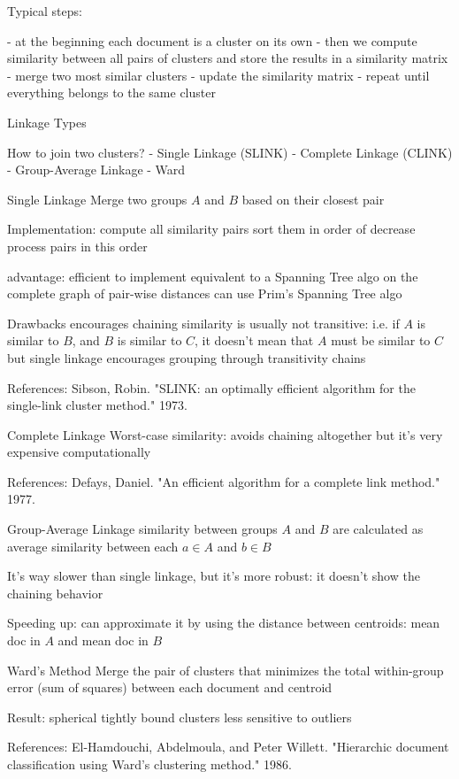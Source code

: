Typical steps:

- at the beginning each document is a cluster on its own
- then we compute similarity between all pairs of clusters and store the results in a similarity matrix
- merge two most similar clusters
- update the similarity matrix
- repeat until everything belongs to the same cluster


Linkage Types

How to join two clusters?
- Single Linkage (SLINK)
- Complete Linkage (CLINK)
- Group-Average Linkage
- Ward 



Single Linkage
Merge two groups $A$ and $B$ based on their closest pair


Implementation:
compute all similarity pairs
sort them in order of decrease
process pairs in this order


advantage:
efficient to implement
equivalent to a Spanning Tree algo on the complete graph of pair-wise distances can use Prim's Spanning Tree algo


Drawbacks
encourages chaining
similarity is usually not transitive:
i.e. if $A$ is similar to $B$, and $B$ is similar to $C$, it doesn't mean that $A$ must be similar to $C$
but single linkage encourages grouping through transitivity chains


References:
Sibson, Robin. "SLINK: an optimally efficient algorithm for the single-link cluster method." 1973. 


 Complete Linkage 
Worst-case similarity:
avoids chaining altogether
but it's very expensive computationally


References:
Defays, Daniel. "An efficient algorithm for a complete link method." 1977. 

Group-Average Linkage
similarity between groups $A$ and $B$ are calculated as average similarity between each $a \in A$ and $b \in B$


It's way slower than single linkage,
but it's more robust: it doesn't show the chaining behavior


Speeding up:
can approximate it by using the distance between centroids: mean doc in $A$ and mean doc in $B$



Ward's Method
Merge the pair of clusters that minimizes the total within-group error (sum of squares) between each document and centroid


Result:
spherical tightly bound clusters
less sensitive to outliers

References:
El-Hamdouchi, Abdelmoula, and Peter Willett. "Hierarchic document classification using Ward's clustering method." 1986. 


